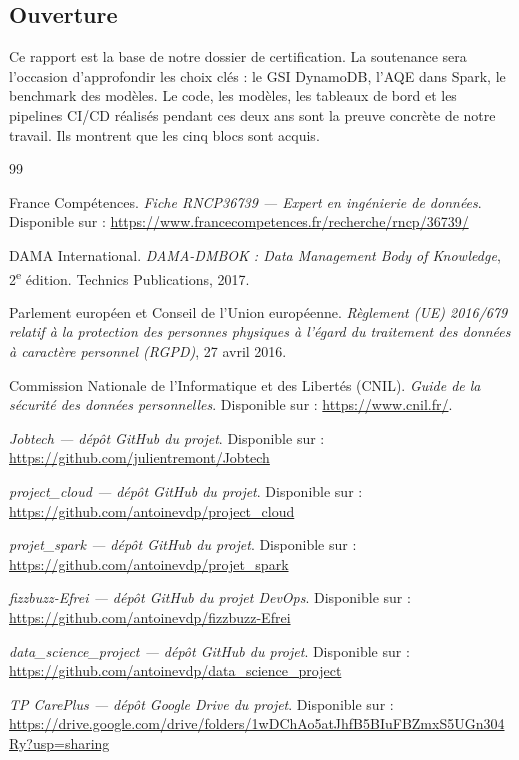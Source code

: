 \documentclass{article}
\begin{document}
\subsection{Ouverture}

Ce rapport est la base de notre dossier de certification. La soutenance sera
l'occasion d'approfondir les choix clés : le GSI DynamoDB, l'AQE dans Spark, le
benchmark des modèles. Le code, les modèles, les tableaux de bord et les pipelines
CI/CD réalisés pendant ces deux ans sont la preuve concrète de notre travail. Ils
montrent que les cinq blocs sont acquis.

\newpage
\begin{thebibliography}{99}

France Compétences.
\textit{Fiche RNCP36739 --- Expert en ingénierie de données}.
Disponible sur : \url{https://www.francecompetences.fr/recherche/rncp/36739/}

DAMA International.
\textit{DAMA-DMBOK : Data Management Body of Knowledge}, 2\textsuperscript{e} édition.
Technics Publications, 2017.

Parlement européen et Conseil de l'Union européenne.
\textit{Règlement (UE) 2016/679 relatif à la protection des personnes physiques à
l'égard du traitement des données à caractère personnel (RGPD)}, 27 avril 2016.

Commission Nationale de l'Informatique et des Libertés (CNIL).
\textit{Guide de la sécurité des données personnelles}.
Disponible sur : \url{https://www.cnil.fr/}.

\textit{Jobtech --- dépôt GitHub du projet}.
Disponible sur : \url{https://github.com/julientremont/Jobtech}

\textit{project\_cloud --- dépôt GitHub du projet}.
Disponible sur : \url{https://github.com/antoinevdp/project_cloud}

\textit{projet\_spark --- dépôt GitHub du projet}.
Disponible sur : \url{https://github.com/antoinevdp/projet_spark}

\textit{fizzbuzz-Efrei --- dépôt GitHub du projet DevOps}.
Disponible sur : \url{https://github.com/antoinevdp/fizzbuzz-Efrei}

\textit{data\_science\_project --- dépôt GitHub du projet}.
Disponible sur : \url{https://github.com/antoinevdp/data_science_project}

\textit{TP CarePlus --- dépôt Google Drive du projet}.
Disponible sur : \url{https://drive.google.com/drive/folders/1wDChAo5atJhfB5BIuFBZmxS5UGn304Ry?usp=sharing}


\end{thebibliography}
\end{document}
